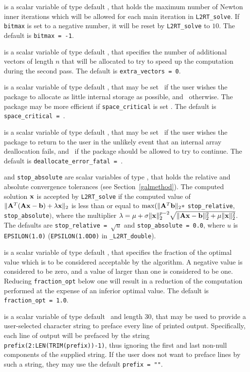 \documentclass{galahad}
\newcommand{\packagename}{L2\-RT}
\newcommand{\fullpackagename}{\libraryname\_\packagename}
\begin{document}
\begin{description}
 is a scalar variable of type default \integer, that holds the 
maximum number of Newton inner iterations which will be allowed for each
main iteration in {\tt \packagename\_solve}. 
If {\tt bitmax} is set to a negative number, it will be reset by  
{\tt \packagename\_solve} to $10$. 
The default is {\tt bitmax = -1}.
 
 is a scalar variable of type default \integer, 
that specifies the number of additional vectors of length $n$
that will be allocated to try to speed up the computation during the
second pass.
The default is {\tt extra\_vectors = 0}.
 
 is a scalar variable of type default \logical, that
may be set \true\ if the user wishes the package to allocate as little
internal storage as possible, and \false\ otherwise. The package may
be more efficient if {\tt space\_critical} is set \false.
The default is {\tt space\_critical = \false}.

 is a scalar variable of type default \logical, 
that may be set \true\ if the user wishes the package to return to the user 
in the unlikely event that an internal array deallocation fails, 
and \false\ if the package should be allowed to try to continue.
The default is {\tt deallocate\_error\_fatal = \false}.

 and {\tt stop\_absolute} are scalar variables of type 
\realdp, that holds the 
relative and absolute convergence tolerances (see Section~\ref{galmethod}).  
The computed solution ${\mathbf{x}}$ is accepted by {\tt \packagename\_solve} 
if the computed value of  
$\|{\mathbf{A}}^T ( {\mathbf{A}} {\mathbf{x}} - {\mathbf{b}} ) + \lambda {\mathbf{x}}\|_2$
is less than or equal 
to $\max (\| {\mathbf{A}}^T {\mathbf{b}} \|_2 \ast$ {\tt stop\_relative}, 
{\tt stop\_absolute}$)$, where the multiplier 
$\lambda = \mu + \sigma \|{\mathbf{x}}\|_2^{p-2} 
 \sqrt{\| {\mathbf{A}} {\mathbf{x}} - {\mathbf{b}} \|_2^2 + \mu \|{\mathbf{x}}\|_2^2}$.
The defaults are {\tt stop\_\-relative = $\sqrt{u}$} and
{\tt stop\_absolute = 0.0}, 
where $u$ is {\tt EPSILON(1.0)} ({\tt EPSILON(1.0D0)} in 
{\tt \fullpackagename\_double}).

 is a scalar variable of type default 
\realdp, that specifies the fraction 
of the optimal value which is to be considered acceptable by the algorithm. 
A negative value is considered to be zero, and a value of larger than one 
is considered to be one. Reducing {\tt fraction\_opt} below one will result 
in a reduction of the computation performed at the expense of an inferior 
optimal value. 
The default is {\tt fraction\_opt = 1.0}.

 is a scalar variable of type default \character\
and length 30, that may be used to provide a user-selected 
character string to preface every line of printed output. 
Specifically, each line of output will be prefaced by the string 
{\tt prefix(2:LEN(TRIM(prefix))-1)},
thus ignoring the first and last non-null components of the
supplied string. If the user does not want to preface lines by such
a string, they may use the default {\tt prefix = ""}.

\end{description}
\end{document}
